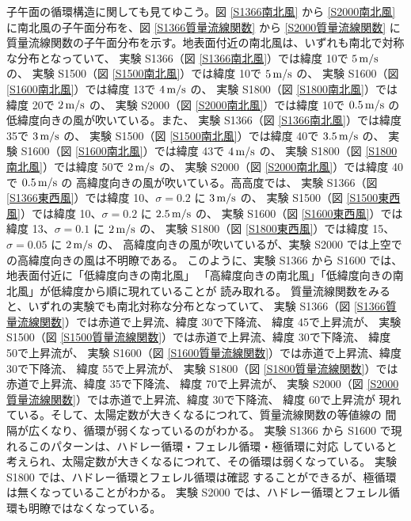 \documentclass[body]{subfiles}
\begin{document}
子午面の循環構造に関しても見てゆこう。図 \ref{S1366南北風} から \ref{S2000南北風}
に南北風の子午面分布を、図 \ref{S1366質量流線関数} から \ref{S2000質量流線関数} に
質量流線関数の子午面分布を示す。地表面付近の南北風は、いずれも南北で対称な分布となっていて、
実験 S1366（図 \ref{S1366南北風}）では緯度 10\textdegree で \(5\hmu{m/s}\) の、
実験 S1500（図 \ref{S1500南北風}）では緯度 10\textdegree で \(5\hmu{m/s}\) の、
実験 S1600（図 \ref{S1600南北風}）では緯度 13\textdegree で \(4\hmu{m/s}\) の、
実験 S1800（図 \ref{S1800南北風}）では緯度 20\textdegree で \(2\hmu{m/s}\) の、
実験 S2000（図 \ref{S2000南北風}）では緯度 10\textdegree で \(0.5\hmu{m/s}\) の
低緯度向きの風が吹いている。また、
実験 S1366（図 \ref{S1366南北風}）では緯度 35\textdegree で \(3\hmu{m/s}\) の、
実験 S1500（図 \ref{S1500南北風}）では緯度 40\textdegree で \(3.5\hmu{m/s}\) の、
実験 S1600（図 \ref{S1600南北風}）では緯度 43\textdegree で \(4\hmu{m/s}\) の、
実験 S1800（図 \ref{S1800南北風}）では緯度 50\textdegree で \(2\hmu{m/s}\) の、
実験 S2000（図 \ref{S2000南北風}）では緯度 40\textdegree で \(0.5\hmu{m/s}\) の
高緯度向きの風が吹いている。高高度では、
実験 S1366（図 \ref{S1366東西風}）では緯度 10\textdegree 、\(\sigma=0.2\) に \(3\hmu{m/s}\) の、
実験 S1500（図 \ref{S1500東西風}）では緯度 10\textdegree 、\(\sigma=0.2\) に \(2.5\hmu{m/s}\) の、
実験 S1600（図 \ref{S1600東西風}）では緯度 13\textdegree 、\(\sigma=0.1\) に \(2\hmu{m/s}\) の、
実験 S1800（図 \ref{S1800東西風}）では緯度 15\textdegree 、\(\sigma=0.05\) に \(2\hmu{m/s}\) の、
高緯度向きの風が吹いているが、実験 S2000 では上空での高緯度向きの風は不明瞭である。
このように、実験 S1366 から S1600 では、地表面付近に「低緯度向きの南北風」
「高緯度向きの南北風」「低緯度向きの南北風」が低緯度から順に現れていることが
読み取れる。
質量流線関数をみると、いずれの実験でも南北対称な分布となっていて、
実験 S1366（図 \ref{S1366質量流線関数}）では赤道で上昇流、緯度 30\textdegree で下降流、
緯度 45\textdegree で上昇流が、
実験 S1500（図 \ref{S1500質量流線関数}）では赤道で上昇流、緯度 30\textdegree で下降流、
緯度 50\textdegree で上昇流が、
実験 S1600（図 \ref{S1600質量流線関数}）では赤道で上昇流、緯度 30\textdegree で下降流、
緯度 55\textdegree で上昇流が、
実験 S1800（図 \ref{S1800質量流線関数}）では赤道で上昇流、緯度 35\textdegree で下降流、
緯度 70\textdegree で上昇流が、
実験 S2000（図 \ref{S2000質量流線関数}）では赤道で上昇流、緯度 30\textdegree で下降流、
緯度 60\textdegree で上昇流が
現れている。そして、太陽定数が大きくなるにつれて、質量流線関数の等値線の
間隔が広くなり、循環が弱くなっているのがわかる。
実験 S1366 から S1600 で現れるこのパターンは、ハドレー循環・フェレル循環・極循環に対応
していると考えられ、太陽定数が大きくなるにつれて、その循環は弱くなっている。
実験 S1800 では、ハドレー循環とフェレル循環は確認
することができるが、極循環は無くなっていることがわかる。
実験 S2000 では、ハドレー循環とフェレル循環も明瞭ではなくなっている。
\end{document}
